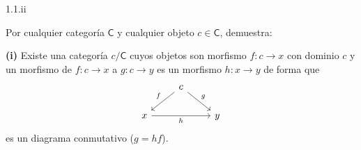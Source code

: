 \begin{Ej}\label{ej:1.1.ii_i}
  1.1.ii 

  Por cualquier categoría $\mathsf{C}$ y cualquier objeto $c\in \mathsf{C}$, demuestra:

  {\bf (i)} Existe una categoría $c/\mathsf{C}$ cuyos objetos son morfismo $f \colon c \rightarrow x$ con dominio $c$ y un morfismo de $f\colon c \rightarrow x$ a $g\colon c \rightarrow y$ es un morfismo $h \colon x \rightarrow y$ de forma que 
\[
  \begin{tikzcd}
    & c \arrow[dl,"f"swap] \arrow[dr,"g"] \\
    x \arrow[rr,"h"swap] & & y
  \end{tikzcd}
\]
  es un diagrama conmutativo ($g=hf$).

\end{Ej}
